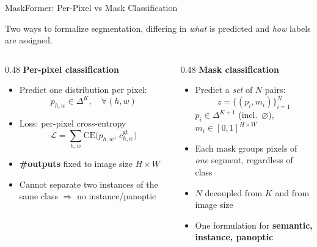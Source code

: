 \begin{frame}{MaskFormer: Per-Pixel vs Mask Classification}

  Two ways to formalize segmentation, differing in \emph{what} is predicted and \emph{how} labels are assigned.

  \vspace{0.4em}
  \begin{columns}[t]
    \begin{column}{0.48\textwidth}
      \textbf{Per-pixel classification} 
      \begin{itemize}
        \item Predict one distribution per pixel:
          \[ p_{h,w} \in \Delta^{K}, \quad \forall (h,w) \]
        \item Loss: per-pixel cross-entropy
          \[ \mathcal{L} = \sum_{h,w} \mathrm{CE}\bigl(p_{h,w},\, c^{\text{gt}}_{h,w}\bigr) \]
        \item \textbf{\#outputs} fixed to image size $H{\times}W$
        \item Cannot separate two instances of the same class $\Rightarrow$ no instance/panoptic
      \end{itemize}
    \end{column}
    \begin{column}{0.48\textwidth}
      \textbf{Mask classification} 
      \begin{itemize}
        \item Predict a \emph{set} of $N$ pairs:
          \[ z = \{(p_i, m_i)\}_{i=1}^{N} \]
          $p_i \in \Delta^{K+1}$ (incl.\ $\varnothing$), \; $m_i \in [0,1]^{H\times W}$
        \item Each mask groups pixels of \emph{one} segment, regardless of class
        \item $N$ decoupled from $K$ and from image size
        \item One formulation for \textbf{semantic, instance, panoptic}
      \end{itemize}
    \end{column}
  \end{columns}

\end{frame}

